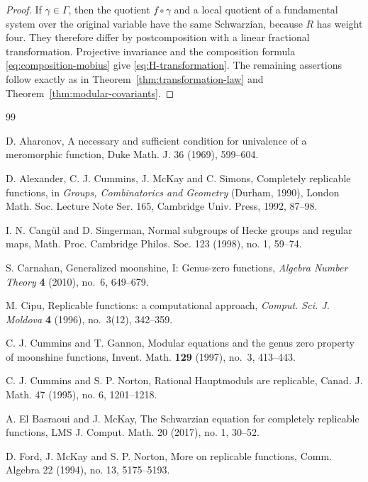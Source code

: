 \documentclass[11pt]{amsart}
\theoremstyle{definition}
\theoremstyle{remark}
\numberwithin{equation}{section}
\begin{document}
\begin{proof}
If \(\gamma\in\Gamma\), then the quotient \(f\circ\gamma\) and a local quotient of a fundamental system over the original variable have the same Schwarzian, because \(R\) has weight four. They therefore differ by postcomposition with a linear fractional transformation. Projective invariance and the composition formula \eqref{eq:composition-mobius} give \eqref{eq:H-transformation}. The remaining assertions follow exactly as in Theorem~\ref{thm:transformation-law} and Theorem~\ref{thm:modular-covariants}.
\end{proof}

\begin{thebibliography}{99}

D. Aharonov,
A necessary and sufficient condition for univalence of a meromorphic function,
Duke Math. J. 36 (1969), 599--604.

D. Alexander, C. J. Cummins, J. McKay and C. Simons,
Completely replicable functions,
in \emph{Groups, Combinatorics and Geometry} (Durham, 1990),
London Math. Soc. Lecture Note Ser. 165, Cambridge Univ. Press, 1992, 87--98.

I. N. Cang\"ul and D. Singerman,
Normal subgroups of Hecke groups and regular maps,
Math. Proc. Cambridge Philos. Soc. 123 (1998), no. 1, 59--74.

S. Carnahan,
Generalized moonshine, I: Genus-zero functions,
\emph{Algebra Number Theory} \textbf{4} (2010), no.~6, 649--679.

M. Cipu,
Replicable functions: a computational approach,
\emph{Comput. Sci. J. Moldova} \textbf{4} (1996), no.~3(12), 342--359.

C. J. Cummins and T. Gannon,
Modular equations and the genus zero property of moonshine functions,
Invent. Math. \textbf{129} (1997), no.~3, 413--443.

C. J. Cummins and S. P. Norton,
Rational Hauptmoduls are replicable,
Canad. J. Math. 47 (1995), no. 6, 1201--1218.


A. El Basraoui and J. McKay,
The Schwarzian equation for completely replicable functions,
LMS J. Comput. Math. 20 (2017), no. 1, 30--52.

D. Ford, J. McKay and S. P. Norton,
More on replicable functions,
Comm. Algebra 22 (1994), no. 13, 5175--5193.


\end{thebibliography}
\end{document}
